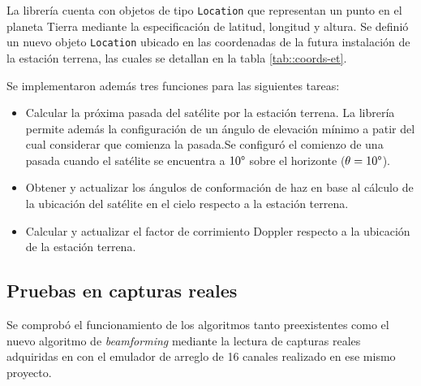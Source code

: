 \documentclass[../../main.tex]{subfiles}
\begin{document}
La librería cuenta con objetos de tipo \texttt{Location} que representan un punto en el planeta Tierra mediante la especificación de latitud, longitud y altura. Se definió un nuevo objeto \texttt{Location} ubicado en las coordenadas de la futura instalación de la estación terrena, las cuales se detallan en la tabla \ref{tab::coords-et}.

\begin{table}[H]
\centering
{}
\caption{Ubicación de la estación terrena considerada para realizar los cálculos.}\label{tab::coords-et}
\end{table}


Se implementaron además tres funciones para las siguientes tareas:
\begin{itemize}
    \item Calcular la próxima pasada del satélite por la estación terrena. La librería permite además la configuración de un ángulo de elevación mínimo a patir del cual considerar que comienza la pasada.Se configuró el comienzo de una pasada cuando el satélite se encuentra a $10\degree$ sobre el horizonte ($\theta = 10\degree$).
    \item Obtener y actualizar los ángulos de conformación de haz en base al cálculo de la ubicación del satélite en el cielo respecto a la estación terrena.
    \item Calcular  y actualizar el factor de corrimiento Doppler respecto a la ubicación de la estación terrena.
\end{itemize}




\subsection{Pruebas en capturas reales}
Se comprobó el funcionamiento de los algoritmos tanto preexistentes como el nuevo algoritmo de \textit{beamforming} mediante la lectura de capturas reales adquiridas en \cite{proyecto-jose} con el emulador de arreglo de 16 canales realizado en ese mismo proyecto.
\end{document}
